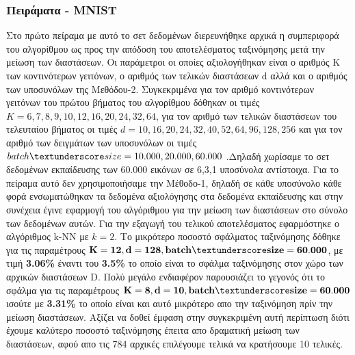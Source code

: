 \subsubsection{Πειράματα - \textlatin{MNIST}}
\par
Στο πρώτο πείραμα με αυτό το σετ δεδομένων διερευνήθηκε αρχικά η συμπεριφορά του αλγορίθμου ως προς την απόδοση του αποτελέσματος ταξινόμησης μετά την μείωση των διαστάσεων. Οι παράμετροι οι οποίες αξιολογήθηκαν είναι ο αριθμός \textlatin{K} των κοντινότερων γειτόνων, ο αριθμός των τελικών διαστάσεων \textlatin{d} αλλά και ο αριθμός των υποσυνόλων της Μεθόδου-2. Συγκεκριμένα για τον αριθμό κοντινότερων γειτόνων του πρώτου βήματος του αλγορίθμου δόθηκαν οι τιμές $K = 6,7,8,9,10,12,16,20,24,32,64$, για τον αριθμό των τελικών διαστάσεων του τελευταίου βήματος οι τιμές $d = 10,16,20,24,32,40,52,64,96,128,256$ και για τον αριθμό των δειγμάτων των υποσυνόλων οι τιμές $batch\textunderscore size = 10.000,20.000,60.000$ .Δηλαδή χωρίσαμε το σετ δεδομένων εκπαίδευσης των 60.000 εικόνων σε 6,3,1 υποσύνολα αντίστοιχα. Για το πείραμα αυτό δεν χρησιμοποιήσαμε την Μέθοδο-1, δηλαδή σε κάθε υποσύνολο κάθε φορά ενσωματώθηκαν τα δεδομένα αξιολόγησης στα δεδομένα εκπαίδευσης και στην συνέχεια έγινε εφαρμογή του αλγόριθμου για την μείωση των διαστάσεων στο σύνολο των δεδομένων αυτών. Για την εξαγωγή του τελικού αποτελέσματος εφαρμόστηκε ο αλγόριθμος \textlatin{k-NN} με $k=2$. Το μικρότερο ποσοστό σφάλματος ταξινόμησης δόθηκε για τις παραμέτρους $\mathbf{K=12, d=128, batch\textunderscore size=60.000}$, με τιμή \textbf{3.06\%} έναντι του \textbf{3.5\%} το οποίο είναι το σφάλμα ταξινόμησης στον χώρο των αρχικών διαστάσεων \textlatin{D}. Πολύ μεγάλο ενδιαφέρον παρουσιάζει το γεγονός ότι το σφάλμα για τις παραμέτρους $\mathbf{K=8, d=10, batch\textunderscore size=60.000}$ ισούτε με \textbf{3.31\%} το οποίο είναι και αυτό μικρότερο απο την ταξινόμηση πρίν την μείωση διαστάσεων. Αξίζει να δοθεί έμφαση στην συγκεκριμένη αυτή περίπτωση διότι έχουμε καλύτερο ποσοστό ταξινόμησης έπειτα απο δραματική μείωση των διαστάσεων, αφού απο τις 784 αρχικές επιλέγουμε τελικά να κρατήσουμε 10 τελικές. 
\par
